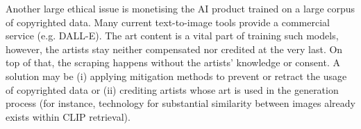 Another large ethical issue is monetising the AI product trained on a large corpus of copyrighted data. Many current text-to-image tools provide a commercial service (e.g. DALL-E). The art content is a vital part of training such models, however, the artists stay neither compensated nor credited at the very last. On top of that, the scraping happens without the artists' knowledge or consent.
A solution may be (i) applying mitigation methods to prevent or retract the usage of copyrighted data or (ii) crediting artists whose art is used in the generation process (for instance, technology for substantial similarity between images already exists within CLIP retrieval). %












